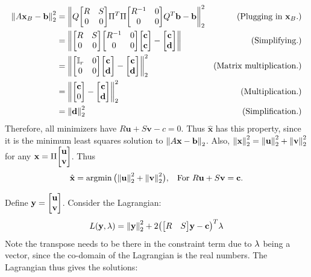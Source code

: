 \begin{solution}
\alignbreak
\begin{align*}
    \norm{A\textbf{x}_B - \textbf{b}}_2^2 &= \norm{Q\mqty[R&S\\0&0]\Pi^T\Pi \mqty[R^\inv &0\\0&0]Q^T\textbf{b} - \textbf{b}}_2^2 &\text{(Plugging in $\textbf{x}_B$.)}\\
    &= \norm{\mqty[R&S\\0&0]\mqty[R^\inv &0\\0&0]\mqty[\textbf{c}\\\textbf{c}] - \mqty[\textbf{c}\\\textbf{d}]} &\text{(Simplifying.)}\\
    &=\norm{\mqty[\id_r&0\\0&0]\mqty[\textbf{c}\\\textbf{d}] - \mqty[\textbf{c}\\\textbf{d}]}_2^2 &\text{(Matrix multiplication.)}\\
    &= \norm{\mqty[\textbf{c}\\0] - \mqty[\textbf{c}\\\textbf{d}]}_2^2 &\text{(Multiplication.)}\\
    &= \norm{\textbf{d}}_2^2 &\text{(Simplification.)}
\end{align*}
\alignbreak
Therefore, all minimizers have $R\textbf{u} + S\textbf{v} - c = 0$. Thus $\hat{\textbf{x}}$ has this property, since it is the minimum least squares solution to $\norm{A\textbf{x} - \textbf{b}}_2$. Also,  $\norm{\textbf{x}}_2^2 = \norm{\textbf{u}}_2^2 + \norm{\textbf{v}}_2^2$ for any $\textbf{x} = \Pi\mqty[\textbf{u}\\\textbf{v}]$. Thus 
\[
\hat{\textbf{x}} = \operatorname*{argmin} \big(\norm{\textbf{u}}_2^2 + \norm{\textbf{v}}_2^2\big), \hspace{3mm} \text{For }R\textbf{u} + S\textbf{v} = \textbf{c}.
\]

Define $\textbf{y} = \mqty[\textbf{u}\\\textbf{v}]$. Consider the Lagrangian:
\[
L(\textbf{y}, \lambda) = \norm{\textbf{y}}_2^2 + 2\big(\mqty[R&S]\textbf{y} - \textbf{c}\big)^T\lm
\]
Note the transpose needs to be there in the constraint term due to $\lambda$ being a vector, since the co-domain of the Lagrangian is the real numbers. The Lagrangian thus gives the solutions:


\end{solution}
